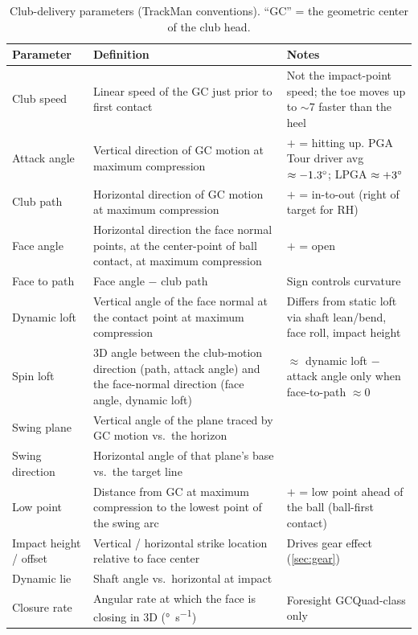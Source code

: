 \begin{table}[htbp]
\centering\small
\caption{Club-delivery parameters (TrackMan conventions). ``GC'' = the
geometric center of the club head.}
\label{tab:clubparams}
\begin{tabular}{@{}p{3.2cm}p{7.2cm}p{4.2cm}@{}}
\toprule
\textbf{Parameter} & \textbf{Definition} & \textbf{Notes} \\
\midrule
Club speed & Linear speed of the GC just prior to first contact &
  Not the impact-point speed; the toe moves up to $\sim$7\mph{} faster than
  the heel \\
Attack angle & Vertical direction of GC motion at maximum compression &
  $+$ = hitting up. PGA Tour driver avg $\approx-1.3\si{\degree}$;
  LPGA $\approx+3\si{\degree}$ \\
Club path & Horizontal direction of GC motion at maximum compression &
  $+$ = in-to-out (right of target for RH) \\
Face angle & Horizontal direction the face normal points, at the
  center-point of ball contact, at maximum compression & $+$ = open \\
Face to path & Face angle $-$ club path & Sign controls curvature \\
Dynamic loft & Vertical angle of the face normal at the contact point at
  maximum compression & Differs from static loft via shaft lean/bend, face
  roll, impact height \\
Spin loft & 3D angle between the club-motion direction (path, attack
  angle) and the face-normal direction (face angle, dynamic loft) &
  $\approx$ dynamic loft $-$ attack angle only when face-to-path
  $\approx 0$ \\
Swing plane & Vertical angle of the plane traced by GC motion vs.\ the
  horizon & \\
Swing direction & Horizontal angle of that plane's base vs.\ the target
  line & \\
Low point & Distance from GC at maximum compression to the lowest point of
  the swing arc & $+$ = low point ahead of the ball (ball-first contact) \\
Impact height / offset & Vertical / horizontal strike location relative to
  face center & Drives gear effect (\cref{sec:gear}) \\
Dynamic lie & Shaft angle vs.\ horizontal at impact & \\
Closure rate & Angular rate at which the face is closing in 3D
  (\si{\degree\per\second}) & Foresight GCQuad-class only \\
\bottomrule
\end{tabular}
\end{table}

